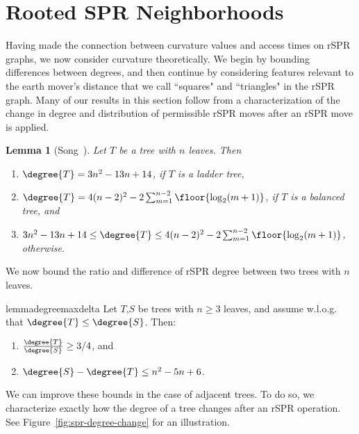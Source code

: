 \documentclass[11pt]{amsart}
\newtheorem{lemma}[theorem]{Lemma}
\newcommand{\cuttable}[2][]{%
    \ifthenelse{\equal{#1}{}}%
		{}%
		{#1}%
}
\begin{document}
\section{Rooted SPR Neighborhoods}
\label{sec:neighborhoods}
Having made the connection between curvature values and access times on rSPR graphs, we now consider curvature theoretically.
We begin by bounding differences between degrees, and then continue by considering features relevant to the earth mover's distance that we call ``squares" and ``triangles" in the rSPR graph.
Many of our results in this section follow from a characterization of the change in degree and distribution of permissible rSPR moves after an rSPR move is applied.

\begin{lemma}[{Song~\cite{Song2003-gf}}]
\cuttable{    \pushQED{\qed}}
	\label{lem:degree_extremes}
	Let $T$ be a tree with $n$ leaves. Then
	\begin{enumerate}
		\item $\degree{T} = 3n^2 - 13n + 14$, if $T$ is a ladder tree,
		\item $\degree{T} = 4(n-2)^2 - 2 \sum_{m=1}^{n-2} \floor{\log_2(m+1)}$, if $T$ is a balanced tree, and
		\item  $3n^2 - 13n + 14 \le \degree{T} \le 4(n-2)^2 - 2 \sum_{m=1}^{n-2} \floor{\log_2(m+1)}$, otherwise.
	\end{enumerate}
\cuttable{    \popQED}
\end{lemma}

We now bound the ratio and difference of rSPR degree between two trees with $n$ leaves.
\begin{restatable}{lemma}{degreemaxdelta}
	\label{lem:degree_max_delta}
	Let $T$,$S$ be trees with $n \ge 3$ leaves, and assume w.l.o.g. that $\degree{T} \le \degree{S}$.
	Then:
	\begin{enumerate}
		\item $\frac{\degree{T}}{\degree{S}} \ge 3/4$, and
		\item $\degree{S} - \degree{T} \le n^2 - 5n + 6$.
	\end{enumerate}
\end{restatable}

We can improve these bounds in the case of adjacent trees.
To do so, we \cuttable{require the following lemma that }characterize\cuttable{s} exactly how the degree of a tree changes after an rSPR operation.
See Figure~\ref{fig:spr-degree-change} for an illustration.
\end{document}
